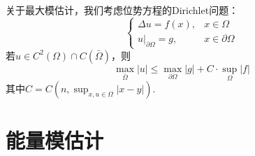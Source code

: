 \documentclass{mynote}
\begin{document}
关于最大模估计，我们考虑位势方程的Dirichlet问题：
\begin{equation}\label{eq:potential_equation}
    \begin{cases}
        \Delta u=f(x), & x\in \Omega\\
        u|_{\partial \Omega}=g, & x\in \partial \Omega
    \end{cases}
\end{equation}
若$u\in C^2(\Omega)\cap C(\bar{\Omega})$，则
\[
    \max_{\bar{\Omega}}|u|\le \max_{\partial \Omega}|g|+C\cdot \sup_{\Omega}|f|
\]
其中$C=C(n,\sup_{x,u\in \Omega}|x-y|)$.

\section{能量模估计}
\end{document}
